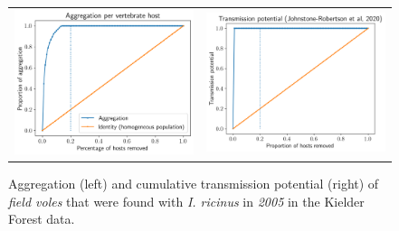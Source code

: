 \documentclass[hidelinks]{article}
\begin{document}
\begin{figure}[]
	\begin{mdframed}[backgroundcolor=grey250,rightline=false,leftline=false,topline=false]
	\centering
	\begin{tabular}{ll}
		\includegraphics[width=.48\linewidth,valign=m]{lorenz_aggregation_FV_2005_I.Ricinus} & \includegraphics[width=.48\linewidth,valign=m]{lorenz_JR_FV_2005_I.Ricinus} \\
	\end{tabular}
	\caption{Aggregation (left) and cumulative transmission potential (right) of \textit{field voles} that were found with \textit{I. ricinus} in \textit{2005} in the Kielder Forest data.}
	\label{fig:lorenz_2005_iricinus_FV}
	\end{mdframed}
\end{figure}
\end{document}
